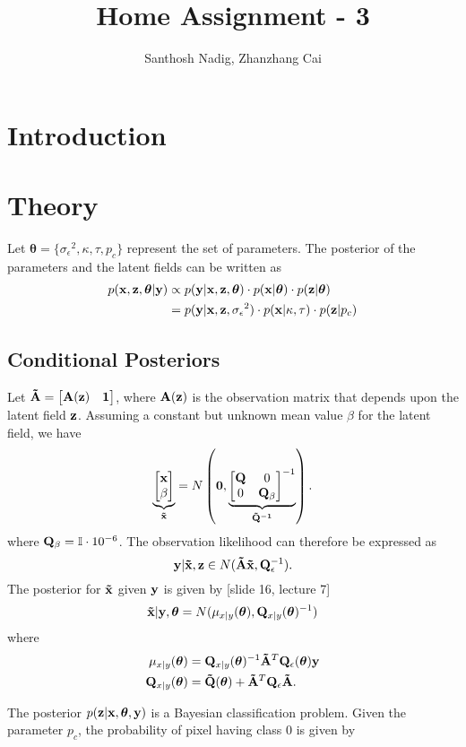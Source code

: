\documentclass[a4paper,10pt]{article}
\title{Home Assignment - 3}
\author{Santhosh Nadig, Zhanzhang Cai}
\def\bA{{\bf A}}
\def\bQ{{\bf Q}}
\def\btQ{{\bf \tilde Q}}
\def\btA{{\bf \tilde A}}
\def\bx{{\bf x}}
\def\by{{\bf y}}
\def\bz{{\bf z}}
\def\btx{{\bf{\tilde x}}}
\def\btheta{{\boldsymbol \theta}}
\def\sigmaeps{{\sigma_{\epsilon}}}
\begin{document}
\maketitle

\section{Introduction}

\section{Theory}
Let $\btheta = \{ \sigmaeps^2, \kappa, \tau, p_c\}$ represent the set of parameters. The posterior of the parameters and the latent fields can be written as
\begin{align}
 p(\bx, \bz, \btheta | \by) &\propto p(\by | \bx, \bz, \btheta) \cdot p(\bx|\btheta) \cdot p(\bz|\btheta) \nonumber \\
 &= p(\by | \bx, \bz, \sigmaeps^2) \cdot p(\bx|\kappa, \tau) \cdot p(\bz|p_c)
\end{align}

\subsection{Conditional Posteriors}

Let $\btA = \begin{bmatrix} \bA(\bz) & \bf{1}\end{bmatrix}$, where  $\bA(\bz)$ is the observation matrix that depends upon the latent field $\bz$. Assuming a constant but unknown mean value $\beta$ for the latent field, we have
\begin{equation}
 \underbrace{\begin{bmatrix}
              \bx \\
              \beta
             \end{bmatrix}
}_{\btx} = N\left( \bf{0}, \underbrace{\begin{bmatrix}
                                  \bQ & 0 \\
                                  0 & \bQ_{\beta}
                                 \end{bmatrix}^{-1}}_{\btQ^{-1}} \right).
\end{equation}
where $\bQ_{\beta} =  \mathbb{I}\cdot 10^{-6}$. The observation likelihood can therefore be expressed as
\begin{equation}
 \by|\btx, \bz \in N(\btA\btx, \bQ_{\epsilon}^{-1}).
\end{equation}
The posterior for $\btx$ given $\by$ is given by [slide 16, lecture 7]
\begin{equation}
 \btx|\by, \btheta = N(\mu_{x|y} (\btheta), \bQ_{x|y}(\btheta)^{-1}) 
\end{equation}
where
\begin{align}
 \mu_{x|y} (\btheta) &=  \bQ_{x|y}(\btheta)^{-1} \btA^T \bQ_{\epsilon} (\btheta) \by \nonumber \\
 \bQ_{x|y}(\btheta) &= \btQ(\btheta) + \btA^T \bQ_{\epsilon}\btA.
\end{align}

The posterior $p(\bz|\bx,\btheta,\by)$ is a Bayesian classification problem. Given the parameter $p_c$, the probability of pixel having class 0 is given by
\begin{align}
 
\end{align}
\end{document}
